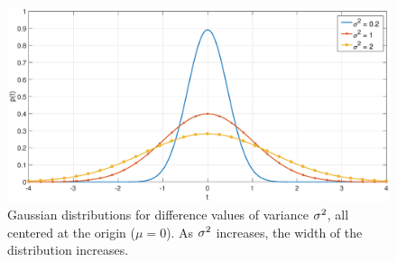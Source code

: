 \begin{figure}
	\centerline{\includegraphics[scale=0.4]{Figures/GaussianDistributions.eps}}
\caption{Gaussian distributions for difference values of variance $\sigma^2$, all centered at the origin ($\mu = 0$). As $\sigma^2$ increases, the width of the distribution increases.}
\label{GaussianDistributions}
\end{figure}

